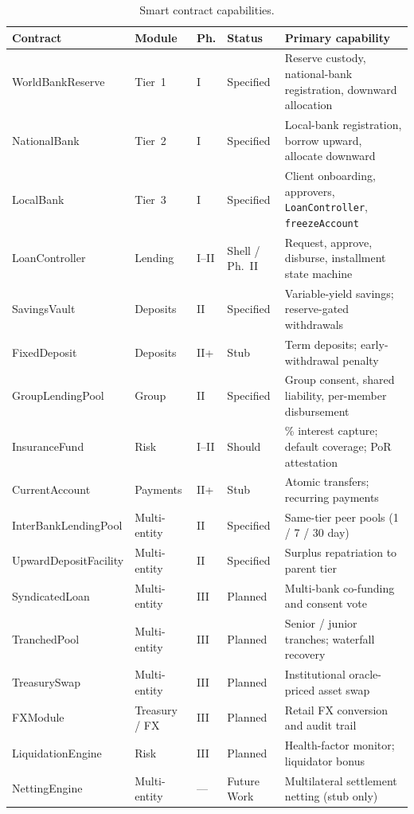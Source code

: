\begin{table}[H]
\centering
\caption[Smart contract capabilities]{Smart contract capabilities.}
\label{tab:appendix-contract-capabilities}
\footnotesize
\setlength{\tabcolsep}{3.5pt}
\renewcommand{\arraystretch}{1.08}
\begin{tabular}{@{}>{\raggedright\arraybackslash}p{2.4cm}>{\raggedright\arraybackslash}p{1.6cm}>{\centering\arraybackslash}p{0.9cm}>{\raggedright\arraybackslash}p{1.5cm}>{\raggedright\arraybackslash}p{6.2cm}@{}}
\toprule
\tableheadcolor
\textbf{Contract} & \textbf{Module} & \textbf{Ph.} & \textbf{Status} & \textbf{Primary capability} \\
\midrule
WorldBankReserve & Tier~1 & I & Specified & Reserve custody, national-bank registration, downward allocation \\
\rowcolor{RowShade}
NationalBank & Tier~2 & I & Specified & Local-bank registration, borrow upward, allocate downward \\
LocalBank & Tier~3 & I & Specified & Client onboarding, approvers, \texttt{LoanController}, \texttt{freezeAccount} \\
\rowcolor{RowShade}
LoanController & Lending & I--II & Shell / Ph.~II & Request, approve, disburse, installment state machine \\
SavingsVault & Deposits & II & Specified & Variable-yield savings; reserve-gated withdrawals \\
\rowcolor{RowShade}
FixedDeposit & Deposits & II+ & Stub & Term deposits; early-withdrawal penalty \\
GroupLendingPool & Group & II & Specified & Group consent, shared liability, per-member disbursement \\
\rowcolor{RowShade}
InsuranceFund & Risk & I--II & Should & 5\% interest capture; default coverage; PoR attestation \\
CurrentAccount & Payments & II+ & Stub & Atomic transfers; recurring payments \\
\rowcolor{RowShade}
InterBankLendingPool & Multi-entity & II & Specified & Same-tier peer pools (1 / 7 / 30 day) \\
UpwardDepositFacility & Multi-entity & II & Specified & Surplus repatriation to parent tier \\
\rowcolor{RowShade}
SyndicatedLoan & Multi-entity & III & Planned & Multi-bank co-funding and consent vote \\
TranchedPool & Multi-entity & III & Planned & Senior / junior tranches; waterfall recovery \\
\rowcolor{RowShade}
TreasurySwap & Multi-entity & III & Planned & Institutional oracle-priced asset swap \\
FXModule & Treasury / FX & III & Planned & Retail FX conversion and audit trail \\
\rowcolor{RowShade}
LiquidationEngine & Risk & III & Planned & Health-factor monitor; liquidator bonus \\
NettingEngine & Multi-entity & --- & Future Work & Multilateral settlement netting (stub only) \\
\bottomrule
\end{tabular}
\end{table}


